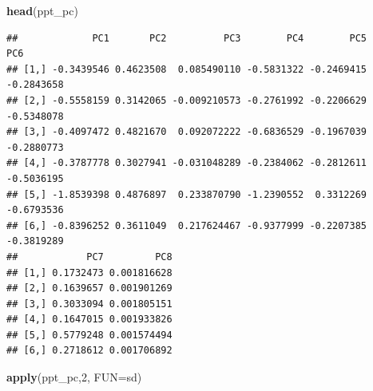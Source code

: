 \documentclass[]{article}
\newenvironment{Shaded}{\begin{snugshade}}{\end{snugshade}}
\newcommand{\CommentTok}[1]{\textcolor[rgb]{0.56,0.35,0.01}{\textit{#1}}}
\newcommand{\DataTypeTok}[1]{\textcolor[rgb]{0.13,0.29,0.53}{#1}}
\newcommand{\DecValTok}[1]{\textcolor[rgb]{0.00,0.00,0.81}{#1}}
\newcommand{\KeywordTok}[1]{\textcolor[rgb]{0.13,0.29,0.53}{\textbf{#1}}}
\newcommand{\NormalTok}[1]{#1}
\newcommand{\OperatorTok}[1]{\textcolor[rgb]{0.81,0.36,0.00}{\textbf{#1}}}
\newcommand{\StringTok}[1]{\textcolor[rgb]{0.31,0.60,0.02}{#1}}
\begin{document}
\begin{Shaded}
\end{Shaded}

\begin{Shaded}
\begin{Highlighting}[]
\KeywordTok{head}\NormalTok{(ppt_pc)}
\end{Highlighting}
\end{Shaded}

\begin{verbatim}
##             PC1       PC2          PC3        PC4        PC5        PC6
## [1,] -0.3439546 0.4623508  0.085490110 -0.5831322 -0.2469415 -0.2843658
## [2,] -0.5558159 0.3142065 -0.009210573 -0.2761992 -0.2206629 -0.5348078
## [3,] -0.4097472 0.4821670  0.092072222 -0.6836529 -0.1967039 -0.2880773
## [4,] -0.3787778 0.3027941 -0.031048289 -0.2384062 -0.2812611 -0.5036195
## [5,] -1.8539398 0.4876897  0.233870790 -1.2390552  0.3312269 -0.6793536
## [6,] -0.8396252 0.3611049  0.217624467 -0.9377999 -0.2207385 -0.3819289
##            PC7         PC8
## [1,] 0.1732473 0.001816628
## [2,] 0.1639657 0.001901269
## [3,] 0.3033094 0.001805151
## [4,] 0.1647015 0.001933826
## [5,] 0.5779248 0.001574494
## [6,] 0.2718612 0.001706892
\end{verbatim}

\begin{Shaded}
\begin{Highlighting}[]
\KeywordTok{apply}\NormalTok{(ppt_pc,}\DecValTok{2}\NormalTok{, }\DataTypeTok{FUN=}\NormalTok{sd)}
\end{Highlighting}
\end{Shaded}
\end{document}
